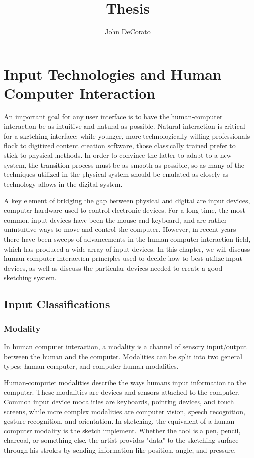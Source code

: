 \documentclass[11pt]{report}
\title{Thesis}
\author{John DeCorato}
\date{ }
\begin{document}
\chapter{Input Technologies and Human Computer Interaction}

An important goal for any user interface is to have the human-computer interaction be as intuitive and natural as possible.
Natural interaction is critical for a sketching interface; while younger, more technologically willing professionals flock to digitized content creation software, those classically trained prefer to stick to physical methods.
In order to convince the latter to adapt to a new system, the transition process must be as smooth as possible, so as many of the techniques utilized in the physical system should be emulated as closely as technology allows in the digital system.

A key element of bridging the gap between physical and digital are input devices, computer hardware used to control electronic devices.
For a long time, the most common input devices  have been the mouse and keyboard, and are rather unintuitive ways to move and control the computer.
However, in recent years there have been sweeps of advancements in the human-computer interaction field, which has produced a wide array of input devices.
In this chapter, we will discuss human-computer interaction principles used to decide how to best utilize input devices, as well as discuss the particular devices needed to create a good sketching system.



\section{Input Classifications}

\subsection{Modality}

In human computer interaction, a modality is a channel of sensory input/output between the human and the computer. Modalities can be split into two general types: human-computer, and computer-human modalities.

Human-computer modalities describe the ways humans input information to the computer.
These modalities are devices and sensors attached to the computer.
Common input device modalities are keyboards, pointing devices, and touch screens, while more complex modalities are computer vision, speech recognition, gesture recognition, and orientation.
In sketching, the equivalent of a human-computer modality is the sketch implement. 
Whether the tool is a pen, pencil, charcoal, or something else. the artist provides "data" to the sketching surface through his strokes by sending information like position, angle, and pressure.
\end{document}
